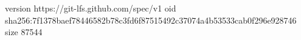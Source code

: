 version https://git-lfs.github.com/spec/v1
oid sha256:7f1378baef78446582b78c3fd6f87515492c37074a4b53533cab0f296e928746
size 87544
